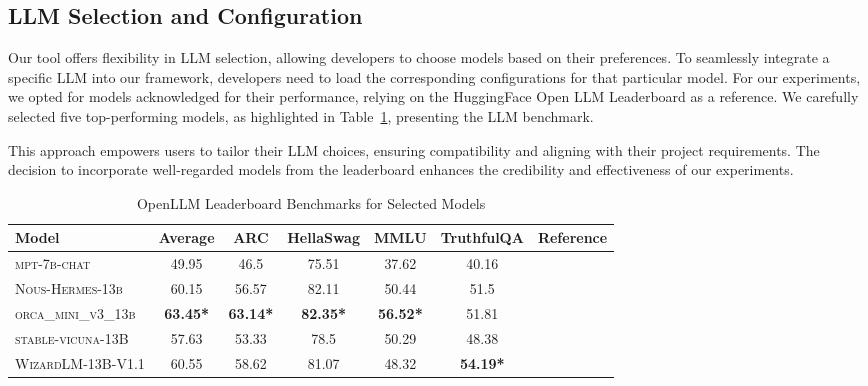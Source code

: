 \vspace{0.1 cm}
\subsection{LLM Selection and Configuration}
\label{sec:llm_configurations}
\vspace{0.1 cm}

Our tool offers flexibility in LLM selection, allowing developers to choose models based on their preferences. To seamlessly integrate a specific LLM into our framework, developers need to load the corresponding configurations for that particular model. For our experiments, we opted for models acknowledged for their performance, relying on the HuggingFace\cite{noauthor_hugging_2023} Open LLM Leaderboard\cite{open-llm-leaderboard} as a reference. We carefully selected five top-performing models, as highlighted in Table~\ref{tab:selected_models}, presenting the LLM benchmark.

This approach empowers users to tailor their LLM choices, ensuring compatibility and aligning with their project requirements. The decision to incorporate well-regarded models from the leaderboard enhances the credibility and effectiveness of our experiments.

\begin{table}[htbp]
    \centering    
    \begin{tabular}{l | c | c | c | c | c | r}
        \textbf{Model} & \textbf{Average} & \textbf{ARC} & \textbf{HellaSwag} & \textbf{MMLU} & \textbf{TruthfulQA} & \textbf{Reference} \\
        \hline
        \scriptsize\textsc{mpt-7b-chat} & 49.95 & 46.5 & 75.51 & 37.62 & 40.16 & \cite{MosaicML2023Introducing}\cite{noauthor_mosaicmlmpt-7b-chat_2023}  \\
        \scriptsize\textsc{Nous-Hermes-13b} & 60.15 & 56.57 & 82.11 & 50.44 & 51.5 & \cite{noauthor_nousresearchnous-hermes-13b_nodate} \\
        \scriptsize\textsc{orca\_mini\_v3\_13b}  & \textbf{63.45*} & \textbf{63.14*} & \textbf{82.35*} & \textbf{56.52*} & 51.81 & \cite{noauthor_pankajmathurorca_mini_v3_13b_2023}\cite{mukherjee2023orca}\\
        \scriptsize\textsc{stable-vicuna-13B}  & 57.63 & 53.33 & 78.5 & 50.29 & 48.38 & \cite{noauthor_theblokestable-vicuna-13b-hf_2023} \\
        \scriptsize\textsc{WizardLM-13B-V1.1}  & 60.55 & 58.62 & 81.07 & 48.32 & \textbf{54.19*} & \cite{noauthor_theblokewizardlm-13b-v1-1-superhot-8k-fp16_nodate}\cite{vicuna2023} \\
    \end{tabular}
\caption{OpenLLM Leaderboard Benchmarks for Selected Models}
\label{tab:selected_models}
\end{table}

